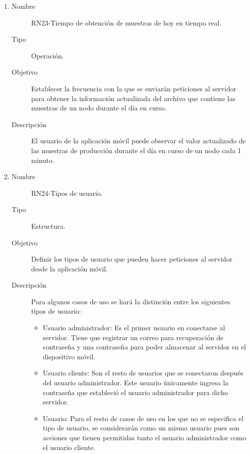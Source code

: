 \begin{enumerate}[label=RN\arabic*.]
\item \label{RN23}
		\begin{description}
			\item[Nombre] RN23-Tiempo de obtención de muestras de hoy en tiempo real.
			\item[Tipo] Operación.
			\item[Objetivo] Establecer la frecuencia con la que se enviarán peticiones al servidor para obtener la información actualizada del archivo que contiene las muestras de un nodo durante el día en curso.
			\item[Descripción] El usuario de la aplicación móvil puede observar el valor actualizado de las muestras de producción durante el día en curso de un nodo cada 1 minuto.
		\end{description}
		
\item \label{RN24}
		\begin{description}
			\item[Nombre] RN24-Tipos de usuario.
			\item[Tipo] Estructura.
			\item[Objetivo] Definir los tipos de usuario que pueden hacer peticiones al servidor desde la aplicación móvil. 
			\item[Descripción] 
			Para algunos casos de uso se hará la distinción entre los siguientes tipos de usuario: 
			\begin{itemize}
		 		\item Usuario administrador: Es el primer usuario en conectarse al servidor. Tiene que registrar un correo para recuperación de contraseña y una contraseña para poder almacenar al servidor en el dispositivo móvil.
		 		\item Usuario cliente: Son el resto de usuarios que se conectaron después del usuario administrador. Este usuario únicamente ingresa la contraseña que estableció el usuario administrador para dicho servidor.
		 		\item Usuario: Para el resto de casos de uso en los que no se especifica el tipo de usuario, se considerarán como un mismo usuario pues son acciones que tienen permitidas tanto el usuario administrador como el usuario cliente.
		    \end{itemize}
		\end{description}
		

\end{enumerate}
